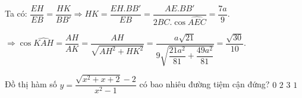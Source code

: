 \begin{ex}
{Ta có: $ \dfrac{EH}{EB}=\dfrac{HK}{BB'}\Rightarrow HK=\dfrac{EH.BB'}{EB}=\dfrac{AE.BB'}{2BC.\cos\widehat{ AEC}}=\dfrac{7a}{9}. $

$ \Rightarrow\cos\widehat{ KAH}=\dfrac{AH}{AK}=\dfrac{AH}{\sqrt{AH^2+HK^2}}=\dfrac{a\sqrt{21}}{9\sqrt{\dfrac{21a^2}{81}+\dfrac{49a^2}{81}}} =\dfrac{\sqrt{30}}{10}.$
}
\end{ex}
\begin{ex}%
Đồ thị hàm số $ y=\dfrac{\sqrt{x^2+x+2}-2}{x^2-1} $  có bao
nhiêu đường tiệm cận đứng?
\choice
{$ 0 $}
{$ 2 $}
{$ 3 $}
{\True $ 1 $}
\end{ex}

